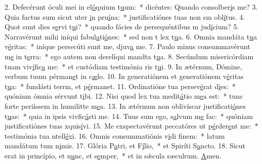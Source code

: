 2. Defecérunt óculi mei in el\uline{ó}quium t\uline{u}um:~* dicéntes: Quando consolber\uline{i}s me?
3. Quia factus sum sicut uter \uline{i}n pru\uline{í}na:~* justificatiónes tuas non sm obl\uline{í}tus.
4. Quot sunt dies s\uline{e}rvi t\uline{u}i?~* quando fácies de persequéntibus m jud\uline{í}cium?
5. Narravérunt mihi iníqui fabul\uline{a}ti\uline{ó}nes:~* sed non t lex t\uline{u}a.
6. Omnia mandáta t\uline{u}a v\uline{é}ritas:~* iníque persecúti sunt me, djuv\uline{a} me.
7. Paulo minus consummavérunt m\uline{e} in t\uline{e}rra:~* ego autem non derelíqui mandta t\uline{u}a.
8. Secúndum misericórdiam tuam viv\uline{í}fic\uline{a} me:~* et custódiam testimónia ris t\uline{u}i.
9. In ætérnum, Dómine, verbum tuum pérman\uline{e}t in c\uline{æ}lo.
10. In generatiónem et generatiónem v\uline{é}ritas t\uline{u}a:~* fundásti terrm, et p\uline{é}rmanet.
11. Ordinatióne tua persev\uline{é}rat d\uline{i}es:~* quóniam ómnia sérvunt t\uline{i}bi.
12. Nisi quod lex tua medit\uline{á}tio m\uline{e}a est:~* tunc forte periíssem in humilitte m\uline{e}a.
13. In ætérnum non oblivíscar justificati\uline{ó}nes t\uline{u}as:~* quia in ipsis vivfic\uline{á}sti me.
14. Tuus sum ego, s\uline{a}lvum m\uline{e} fac:~* quóniam justificatiónes tuas xquis\uline{í}vi.
15. Me exspectavérunt peccatóres ut p\uline{é}rder\uline{e}nt me:~* testimónia tua ntell\uline{é}xi.
16. Omnis consummatiónis v\uline{i}di f\uline{i}nem:~* latum mandátum tum n\uline{i}mis.
17. Glória P\uline{a}tri, et F\uline{í}lio,~* et Spiríti S\uline{a}ncto.
18. Sicut erat in princípio, et n\uline{u}nc, et s\uline{e}mper,~* et in sǽcula sæculrum. \uline{A}men.
